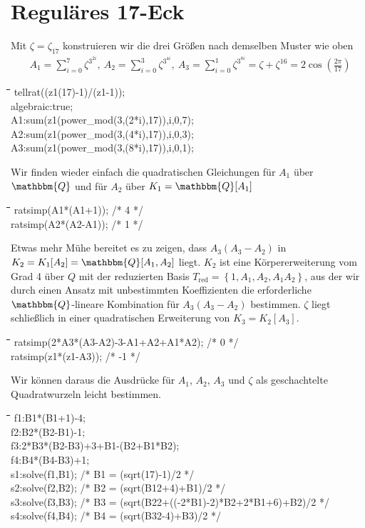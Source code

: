 \documentclass[11pt]{article}
\newcommand{\br}[1]{\ensuremath{\left(#1\right)}}
\newcommand{\cbr}[1]{\ensuremath{\left\{#1\right\}}}
\newcommand{\Q}{\mathbbm{Q}}
\def\pw{{\char94}}
\newenvironment{code}{\tt \begin{tabbing}
\hskip12pt\=\hskip12pt\=\hskip12pt\=\hskip12pt\=\hskip5cm\=\hskip5cm\=\kill}
{\end{tabbing}}
\begin{document}
\section{Reguläres 17-Eck}

Mit $\zeta=\zeta_{17}$ konstruieren wir die drei Größen nach demselben Muster
wie oben
\begin{align*}
  A_1=\sum_{i=0}^7{\zeta^{3^{2i}}},\
  A_2=\sum_{i=0}^3{\zeta^{3^{4i}}},\
  A_3=\sum_{i=0}^1{\zeta^{3^{8i}}}=\zeta+\zeta^{16}=2\cos\br{\frac{2\pi}{17}}
\end{align*}

\begin{code}  
tellrat((z1\pw(17)-1)/(z1-1));\\
algebraic:true;\\
A1:sum(z1\pw(power\_mod(3,(2*i),17)),i,0,7);\\
A2:sum(z1\pw(power\_mod(3,(4*i),17)),i,0,3);\\
A3:sum(z1\pw(power\_mod(3,(8*i),17)),i,0,1);
\end{code}
Wir finden wieder einfach die quadratischen Gleichungen für $A_1$ über $\Q$
und für $A_2$ über $K_1=\Q[A_1]$ 
\begin{code}  
ratsimp(A1*(A1+1));  /* 4 */\\
ratsimp(A2*(A2-A1)); /* 1 */
\end{code}
Etwas mehr Mühe bereitet es zu zeigen, dass $A_3(A_3-A_2)$ in
$K_2=K_1[A_2]=\Q[A_1,A_2]$ liegt. $K_2$ ist eine Körpererweiterung vom Grad 4
über $Q$ mit der reduzierten Basis $T_\text{red}=\cbr{1,A_1,A_2,A_1A_2}$, aus
der wir durch einen Ansatz mit unbestimmten Koeffizienten die erforderliche
$\Q$-lineare Kombination für $A_3(A_3-A_2)$ bestimmen.  $\zeta$ liegt
schließlich in einer quadratischen Erweiterung von $K_3=K_2[A_3]$.
\begin{code}  
ratsimp(2*A3*(A3-A2)-3-A1+A2+A1*A2); /* 0 */\\
ratsimp(z1*(z1-A3)); /* -1 */
\end{code}
Wir können daraus die Ausdrücke für $A_1$, $A_2$, $A_3$ und $\zeta$ als
geschachtelte Quadratwurzeln leicht bestimmen.
\begin{code}  
f1:B1*(B1+1)-4;   \\
f2:B2*(B2-B1)-1;  \\
f3:2*B3*(B2-B3)+3+B1-(B2+B1*B2);\\  
f4:B4*(B4-B3)+1;  \\
s1:solve(f1,B1);  /* B1 = (sqrt(17)-1)/2 */\\
s2:solve(f2,B2);  /* B2 = (sqrt(B1\pw2+4)+B1)/2 */\\
s3:solve(f3,B3);  /* B3 = (sqrt(B2\pw2+((-2*B1)-2)*B2+2*B1+6)+B2)/2 */\\
s4:solve(f4,B4);  /* B4 = (sqrt(B3\pw2-4)+B3)/2 */
\end{code}
\end{document}
